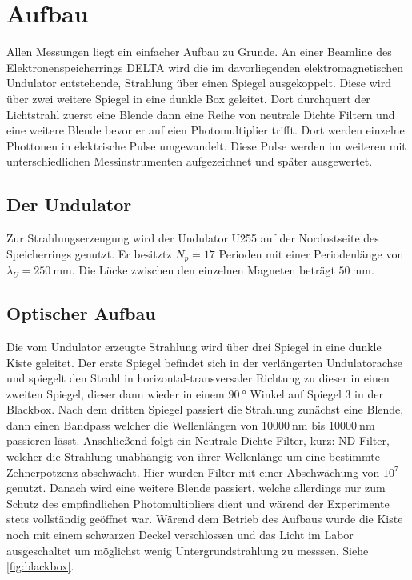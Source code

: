 \section{Aufbau}
\label{sec:Aufbau}
Allen Messungen liegt ein einfacher Aufbau zu Grunde. An einer Beamline des Elektronenspeicherrings DELTA
wird die im davorliegenden elektromagnetischen Undulator entstehende, Strahlung über einen Spiegel 
ausgekoppelt. Diese wird über zwei weitere Spiegel in eine dunkle Box geleitet. Dort durchquert der 
Lichtstrahl zuerst eine Blende dann eine Reihe von neutrale Dichte Filtern und eine weitere Blende bevor 
er auf eien Photomultiplier trifft. Dort werden einzelne Phottonen in elektrische Pulse umgewandelt.
Diese Pulse werden im weiteren mit unterschiedlichen Messinstrumenten aufgezeichnet und später ausgewertet.

\subsection{Der Undulator}
\label{sec:Undulator}
Zur Strahlungserzeugung wird der Undulator U255 auf der Nordostseite des Speicherrings genutzt.
Er besitztz $N_p= 17$ Perioden mit einer Periodenlänge von $\lambda_U=\SI{250}{\milli\meter}$.
Die Lücke zwischen den einzelnen Magneten beträgt $\SI{50}{\milli\meter}$.

\subsection{Optischer Aufbau}
\label{sec:Optik}
Die vom Undulator erzeugte Strahlung wird über drei Spiegel in eine dunkle Kiste geleitet. Der erste Spiegel
befindet sich in der verlängerten Undulatorachse und spiegelt den Strahl in horizontal-transversaler Richtung 
zu dieser in einen zweiten Spiegel, dieser dann wieder in einem $\SI{90}{\degree}$ Winkel auf Spiegel 3 in der
Blackbox. Nach dem dritten Spiegel passiert die Strahlung zunächst eine Blende, dann einen Bandpass welcher die 
Wellenlängen von $\SI{10000}{\nano\meter}$ bis $\SI{10000}{\nano\meter}$ passieren lässt. Anschließend folgt
ein Neutrale-Dichte-Filter, kurz: ND-Filter, welcher die Strahlung unabhängig von ihrer Wellenlänge um eine
bestimmte Zehnerpotzenz abschwächt. Hier wurden Filter mit einer Abschwächung von $10^7$ genutzt. Danach 
wird eine weitere Blende passiert, welche allerdings nur zum Schutz des empfindlichen Photomultipliers dient 
und wärend der Experimente stets vollständig geöffnet war. Wärend dem Betrieb des Aufbaus wurde die Kiste noch 
mit einem schwarzen Deckel verschlossen und das Licht im Labor ausgeschaltet um möglichst wenig Untergrundstrahlung
zu messsen. Siehe \autoref{fig:blackbox}.

